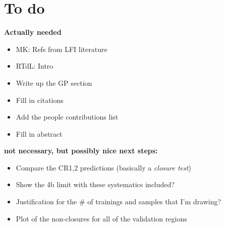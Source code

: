 \section{To do}
\label{app:toDo}


\textbf{Actually needed}
\begin{itemize}
	\item MK: Refs from LFI literature
	\item RTdL: Intro
	\item Write up the GP section
	\item Fill in citations
	\item Add the people contributions list
	\item Fill in abstract
\end{itemize}


\textbf{not necessary, but possibly nice next steps:}
\begin{itemize}
    \item Compare the CR{1,2} predictions (basically a \emph{closure test})
    \item Show the 4b limit with these systematics included?
    \item Justification for the \# of trainings and samples that I'm drawing?
    \item Plot of the non-closures for all of the validation regions
    
\end{itemize}

